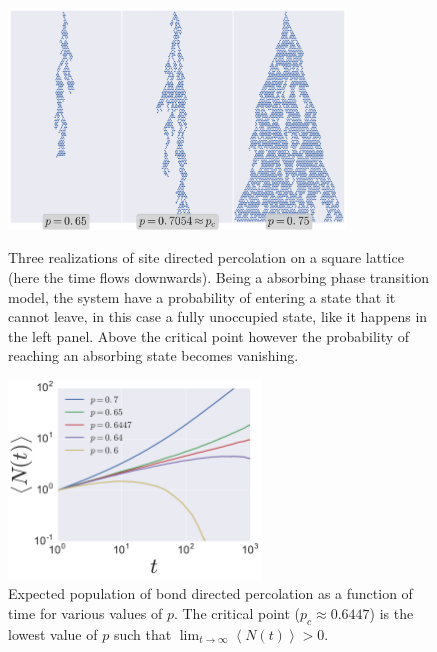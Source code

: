 \begin{figure}
\begin{center}
    \includegraphics[width=0.8\textwidth]{chapters/ch5-anis/figs/dperco}
\end{center}
\caption{Three realizations of site directed percolation on a square lattice
    (here the time flows downwards). Being a absorbing phase transition model,
    the system have a probability of entering a state that it cannot leave, in
    this case a fully unoccupied state, like it happens in the left panel.
    Above the critical point however the probability of reaching an absorbing
    state becomes vanishing.}
\label{fig:dperco}

\begin{center}
    \includegraphics[width=0.6\textwidth]{chapters/ch5-anis/figs/dperco_nt}
\end{center}
\caption{Expected population of bond directed percolation as a function of time
    for various values of $p$. The critical point ($p_c\approx0.6447$) is the
    lowest value of $p$ such that $\lim_{t\rightarrow\infty}\left\langle
    N(t)\right\rangle>0$.}
\label{fig:dperco_nt}
\end{figure}

\pagebreak
